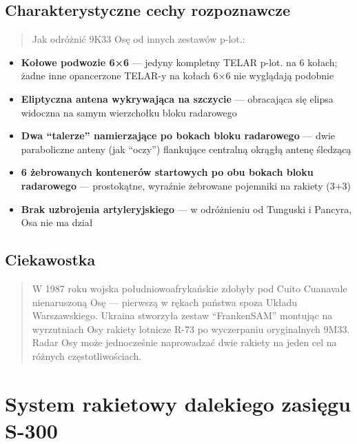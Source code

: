 \documentclass[12pt,oneside]{book}
\providecommand{\tightlist}{%
  \setlength{\itemsep}{0pt}\setlength{\parskip}{0pt}}
\begin{document}
\subsection{Charakterystyczne cechy
rozpoznawcze}\label{charakterystyczne-cechy-rozpoznawcze-41}

\begin{quote}
Jak odróżnić 9K33 Osę od innych zestawów p-lot.:
\end{quote}

\begin{itemize}
\tightlist
\item
  \textbf{Kołowe podwozie 6×6} --- jedyny kompletny TELAR p-lot. na 6
  kołach; żadne inne opancerzone TELAR-y na kołach 6×6 nie wyglądają
  podobnie
\item
  \textbf{Eliptyczna antena wykrywająca na szczycie} --- obracająca się
  elipsa widoczna na samym wierzchołku bloku radarowego
\item
  \textbf{Dwa ``talerze'' namierzające po bokach bloku radarowego} ---
  dwie paraboliczne anteny (jak ``oczy'') flankujące centralną okrągłą
  antenę śledzącą
\item
  \textbf{6 żebrowanych kontenerów startowych po obu bokach bloku
  radarowego} --- prostokątne, wyraźnie żebrowane pojemniki na rakiety
  (3+3)
\item
  \textbf{Brak uzbrojenia artyleryjskiego} --- w odróżnieniu od Tunguski
  i Pancyra, Osa nie ma dział
\end{itemize}

\subsection{Ciekawostka}\label{ciekawostka-41}

\begin{quote}
W 1987 roku wojska południowoafrykańskie zdobyły pod Cuito Cuanavale
nienaruszoną Osę --- pierwszą w rękach państwa spoza Układu
Warszawskiego. Ukraina stworzyła zestaw ``FrankenSAM'' montując na
wyrzutniach Osy rakiety lotnicze R-73 po wyczerpaniu oryginalnych 9M33.
Radar Osy może jednocześnie naprowadzać dwie rakiety na jeden cel na
różnych częstotliwościach.
\end{quote}

\section{System rakietowy dalekiego zasięgu
S-300}\label{system-rakietowy-dalekiego-zasiux119gu-s-300}
\end{document}
